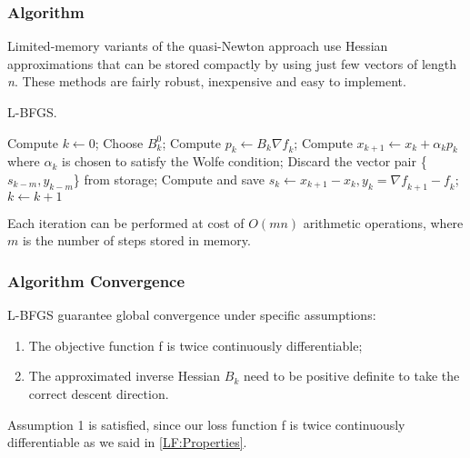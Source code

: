 \subsubsection{Algorithm}
Limited-memory variants  of  the  quasi-Newton  approach use  Hessian  approximations  that  can  be stored compactly by using just few vectors of length \textit{n}. These methods are fairly robust, inexpensive and easy to implement.

\begin{algorithm}[H]
	\caption{L-BFGS.}
	\label{alg:LBFGS}
	\begin{algorithmic}[4]
		\State Compute $k \gets 0$;
		\Repeat
		\State Choose \textbf{$B^0_k$};
		\State Compute $p_k \gets B_k\nabla \textit{f}_k$;
		\State Compute $x_{k+1} \gets x_{k}+ \alpha_{k}p_{k}$ where $\alpha_{k}$ is chosen to satisfy the Wolfe condition;
		\State Discard the vector pair \{$s_{k-m},y_{k-m}$\} from storage;
		\EndIf
		\State Compute and save $s_k \gets x_{k+1}-x_{k}, y_k=\nabla \textit{f}_{k+1}-\textit{f}_k$;
		\State $k \gets k+1$
		\EndProcedure 
	\end{algorithmic}
\end{algorithm}

Each iteration can be performed at cost of $O(mn)$ arithmetic operations, where $m$ is the number of steps stored in memory.

\subsubsection{Algorithm Convergence}
\label{L-BFGSConv}
L-BFGS guarantee global convergence under specific assumptions:
\begin{enumerate} \label{convergence:assumption}
	\item The objective function f is twice continuously differentiable;
	\item The approximated inverse Hessian $B_{k}$ need to be positive definite to take the correct descent direction.
\end{enumerate}


Assumption 1 is satisfied, since our loss function f is twice continuously differentiable as we said in \ref{LF:Properties}. 
                                                       
